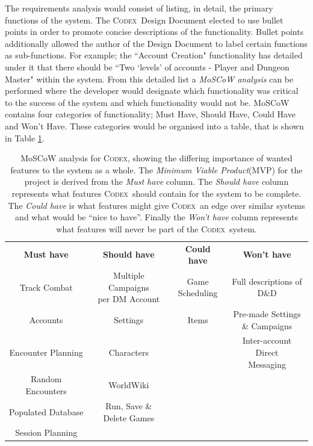 \documentclass[final]{cmpreport}
\newcommand{\Codex}{\textsc{Codex}}
\begin{document}
		The requirements analysis would consist of listing, in detail, the primary functions of the system. The \Codex \ Design Document elected to use bullet points in order to promote concise descriptions of the functionality. Bullet points additionally allowed the author of the Design Document to label certain functions as sub-functions. For example; the ``Account Creation" functionality has detailed under it that there should be ``Two `levels' of accounts - Player and Dungeon Master" within the system. From this detailed list a \emph{MoSCoW analysis} can be performed where the developer would designate which functionality was critical to the success of the system and which functionality would not be. MoSCoW contains four categories of functionality; Must Have, Should Have, Could Have and Won't Have. These categories would be organised into a table, that is shown in Table \ref{tab:moscow}.
		
		\begin{table}[h]
			\centering
			\begin{tabular}{|c|c|c|c|}
				\hline
				\textbf{Must have} 					& \textbf{Should have}              	& \textbf{Could have} & \textbf{Won't have}             	  \\ \hhline{|=|=|=|=|}
				Track Combat      					&\makecell{Multiple Campaigns \\ per DM Account}	& \makecell{Game \\ Scheduling}     & \makecell{Full descriptions of \\ D\&D} \\ \hline
				Accounts          					& Settings								& Items               & \makecell{Pre-made Settings \\ \& Campaigns}\\ \hline
				Encounter Planning 					& Characters                        	&                     & \makecell{Inter-account Direct \\ Messaging} \\ \hline
				Random Encounters  					& WorldWiki                        		&                     &                                	  \\ \hline
				Populated Database 					& \makecell{Run, Save \& \\ Delete Games} 			&                     &                                   \\ \hline
				Session Planning					&         								&                     &                                   \\ \hline
			\end{tabular}
			\caption[\Codex \ MoSCoW analysis]{MoSCoW analysis for \Codex, showing the differing importance of wanted features to the system as a whole. The \emph{Minimum Viable Product}(MVP) for the project is derived from the \emph{Must have} column. The \emph{Should have} column represents what features \Codex \ should contain for the system to be complete. The \emph{Could have} is what features might give \Codex \ an edge over similar systems and what would be ``nice to have''. Finally the \emph{Won't have} column represents what features will never be part of the \Codex \ system.}\label{tab:moscow}
		\end{table}
	
\end{document}
